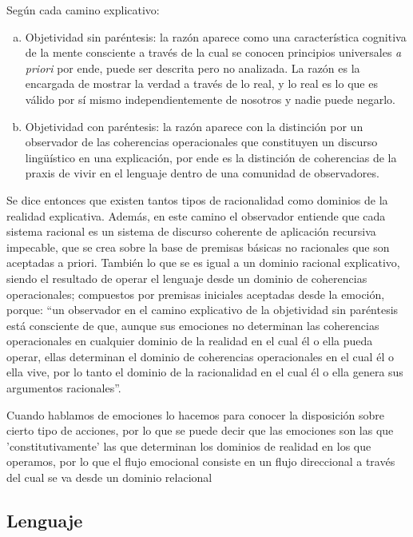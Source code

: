 \documentclass[10pt]{article}
\begin{document}
        Según cada camino explicativo:
        
        \begin{enumerate}[a.]
            \item Objetividad sin paréntesis: la razón aparece como una característica cognitiva de la mente consciente a través de la cual se conocen principios universales \textit{a priori} por ende, puede ser descrita pero no analizada. La razón es la encargada de mostrar la verdad a través de lo real, y lo real es lo que es válido por sí mismo independientemente de nosotros y nadie puede negarlo.
            \item Objetividad con paréntesis: la razón aparece con la distinción por un observador de las coherencias operacionales que constituyen un discurso lingüístico en una explicación, por ende es la distinción de coherencias de la praxis de vivir en el lenguaje dentro de una comunidad de observadores.
        \end{enumerate}
        
        Se dice entonces que existen tantos tipos de racionalidad como dominios de la realidad explicativa. Además, en este camino el observador entiende que cada sistema racional es un sistema de discurso coherente de aplicación recursiva impecable, que se crea sobre la base de premisas básicas no racionales que son aceptadas a priori. También lo que se es igual a un dominio racional explicativo, siendo el resultado de operar el lenguaje desde un dominio de coherencias operacionales; compuestos por premisas iniciales aceptadas desde la emoción, porque: “un observador en el camino explicativo de la objetividad sin paréntesis está consciente de que, aunque sus emociones no determinan las coherencias operacionales en cualquier dominio de la realidad en el cual él o ella pueda operar, ellas determinan el dominio de coherencias operacionales en el cual él o ella vive, por lo tanto el dominio de la racionalidad en el cual él o ella genera sus argumentos racionales”.
        
        Cuando hablamos de emociones lo hacemos para conocer la disposición sobre cierto tipo de acciones, por lo que se puede decir que las emociones son las que 'constitutivamente' las que determinan los dominios de realidad en los que operamos, por lo que el flujo emocional consiste en un flujo direccional a través del cual se va desde un dominio relacional

        
        \subsection{Lenguaje}
\end{document}
